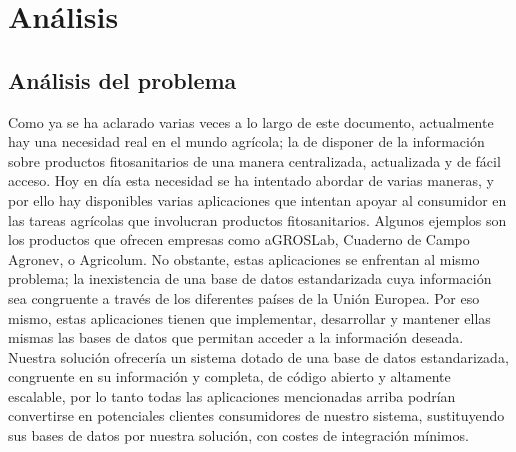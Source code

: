 \chapter{Análisis} \label{analisis}
\section{Análisis del problema} \label{analisis.problema}
Como ya se ha aclarado varias veces a lo largo de este documento, actualmente hay una necesidad real en el mundo agrícola; la de disponer de la información sobre productos fitosanitarios de una manera centralizada, actualizada y de fácil acceso. Hoy en día esta necesidad se ha intentado abordar de varias maneras, y por ello hay disponibles varias aplicaciones que intentan apoyar al consumidor en las tareas agrícolas que involucran productos fitosanitarios. Algunos ejemplos son los productos que ofrecen empresas como aGROSLab, Cuaderno de Campo Agronev, o Agricolum. No obstante, estas aplicaciones se enfrentan al mismo problema; la inexistencia de una base de datos estandarizada cuya información sea congruente a través de los diferentes países de la Unión Europea. Por eso mismo, estas aplicaciones tienen que implementar, desarrollar y mantener ellas mismas las bases de datos que permitan acceder a la información deseada. Nuestra solución ofrecería un sistema dotado de una base de datos estandarizada, congruente en su información y completa, de código abierto y altamente escalable, por lo tanto todas las aplicaciones mencionadas arriba podrían convertirse en potenciales clientes consumidores de nuestro sistema, sustituyendo sus bases de datos por nuestra solución, con costes de integración mínimos.

